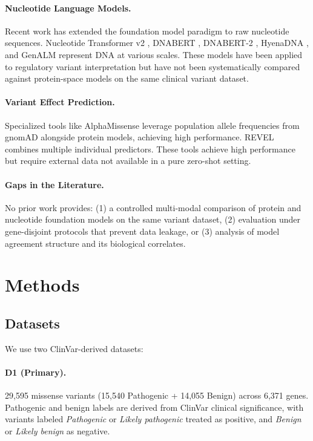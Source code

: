 \documentclass{article}
\begin{document}
\paragraph{Nucleotide Language Models.} Recent work has extended the foundation model paradigm to raw nucleotide sequences. Nucleotide Transformer v2 \cite{dalla2024nucleotide}, DNABERT \cite{ji2021dnabert}, DNABERT-2 \cite{zeng2024dnabert2}, HyenaDNA \cite{nguyen2023hyenadna}, and GenALM \cite{singh2024genalm} represent DNA at various scales. These models have been applied to regulatory variant interpretation but have not been systematically compared against protein-space models on the same clinical variant dataset.

\paragraph{Variant Effect Prediction.} Specialized tools like AlphaMissense \cite{cheng2023alphamissense} leverage population allele frequencies from gnomAD alongside protein models, achieving high performance. REVEL \cite{ioannidis2016revel} combines multiple individual predictors. These tools achieve high performance but require external data not available in a pure zero-shot setting.

\paragraph{Gaps in the Literature.} No prior work provides: (1) a controlled multi-modal comparison of protein and nucleotide foundation models on the same variant dataset, (2) evaluation under gene-disjoint protocols that prevent data leakage, or (3) analysis of model agreement structure and its biological correlates.

\section{Methods}

\subsection{Datasets}

We use two ClinVar-derived datasets:

\paragraph{D1 (Primary).} 29,595 missense variants (15,540 Pathogenic + 14,055 Benign) across 6,371 genes. Pathogenic and benign labels are derived from ClinVar clinical significance, with variants labeled \textit{Pathogenic} or \textit{Likely pathogenic} treated as positive, and \textit{Benign} or \textit{Likely benign} as negative.
\end{document}
